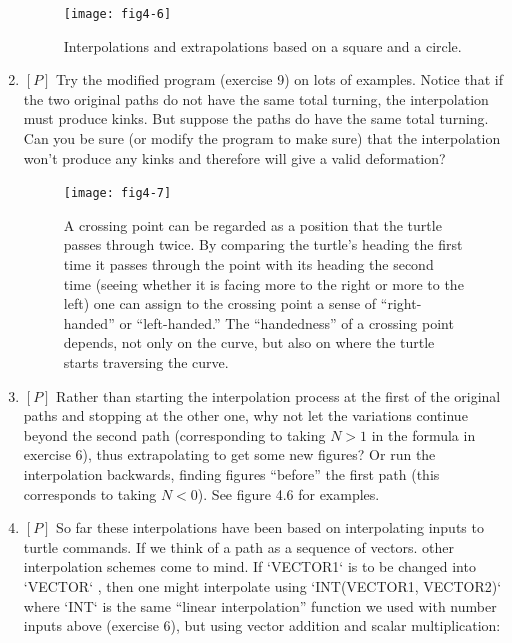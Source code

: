 \documentclass{book}
\begin{document}
\begin{enumerate}
\begin{figure}
\begin{center}
\texttt{[image: fig4-6]}
\caption{Interpolations and extrapolations based on a square and a circle.}
\end{center}
\end{figure}

\item $[P]$ Try the modified program (exercise 9) on lots of examples. Notice
that if the two original paths do not have the same total turning, the
interpolation must produce kinks. But suppose the paths do have the
same total turning. Can you be sure (or modify the program to make
sure) that the interpolation won't produce any kinks and therefore will
give a valid deformation?

\begin{figure}
\begin{center}
\texttt{[image: fig4-7]}
\caption{A crossing point can be regarded as a position that the turtle passes through twice. By comparing the turtle's heading the first time it passes through the point with its heading the second time (seeing whether it is facing more to the right or more to the left) one can assign to the crossing point a sense of ``right-handed'' or ``left-handed.'' The ``handedness'' of a crossing point depends, not only on the curve, but also on where the turtle starts traversing the curve.}
\end{center}
\end{figure}

\item $[P]$ Rather than starting the interpolation process at the first of the
original paths and stopping at the other one, why not let the variations
continue beyond the second path (corresponding to taking $N > 1$ in the
formula in exercise 6), thus extrapolating to get some new figures? Or
run the interpolation backwards, finding figures ``before'' the first path
(this corresponds to taking $N < 0$). See figure 4.6 for examples.

\item $[P]$ So far these interpolations have been based on interpolating
inputs to turtle commands. If we think of a path as a sequence of vectors.
other interpolation schemes come to mind. If \textsc{`VECTOR1`} is to be changed
into \textsc{`VECTOR`} , then one might interpolate using \textsc{`INT(VECTOR1, VECTOR2)`}
where \textsc{`INT`} is the same ``linear interpolation'' function we used with
number inputs above (exercise 6), but using vector addition and scalar
multiplication:


\end{enumerate}
\end{document}
